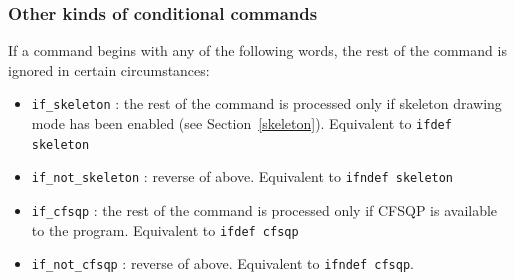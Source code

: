 \documentclass[letterpaper,12pt]{report}
\newcommand{\comment}[1]{}
\begin{document}
\comment{

\subsubsection[The layout variable]{The {\tt layout} variable}

This functionality is deprecated, and I believe it is not used in the demo files.  The {\tt define} functionality gives a more powerful syntax than the older ``layout'' functionality.

Sometimes it{\textquoteright}s not clear what the best way to layout a
motif is. In this case, you might need to write conflicting
R2R commands, and it{\textquoteright}s a hassle to switch the decision
as you think about it.  Therefore, R2R has a built in variable
layoutName, and the ability to run R2R commands only in a given layout.
It does not have a proper preprocessor (which is arguably what I should
do, except that the C/C++ preprocessor cannot be valid Stockholm
format).

{\tt set\_layout} \textit{layoutName}

sets the current layoutName.

{\tt if\_layout} \textit{layoutName}

The following commands (until the next {\tt if\_layout} command) are processed
only if the current layoutName is equal to \textit{layoutName}, or if
\textit{layoutName} is {\textquotedblleft}{\tt all}{\textquotedblright}.

Note: these commands are equivalent to others as follows:
\begin{itemize}
\item {\tt set\_layout quick} is equivalent to {\tt define layout quick}
\item {\tt if\_layout quick} is equivalent to {\tt ifdefeq layout quick}, except that no {\tt else} or {\tt endif} is required or allowed.
\item {\tt if\_layout any} is special, and not equivalent to other commands.  It cannot be mixed with {\tt define} commands.
\end{itemize}
}

\subsubsection{Other kinds of conditional commands}

If a command begins with any of the following words, the rest of the command
is ignored in certain circumstances:
\begin{itemize}
\item {\tt if\_skeleton} : the rest of the command is processed only
if skeleton drawing mode has been enabled (see Section~\ref{skeleton}).  Equivalent to {\tt ifdef skeleton}
\item {\tt if\_not\_skeleton} : reverse of above. Equivalent to {\tt ifndef skeleton}
\item {\tt if\_cfsqp} : the rest of the command is processed only if CFSQP
is available to the program.  Equivalent to {\tt ifdef cfsqp}
\item {\tt if\_not\_cfsqp} : reverse of above.  Equivalent to {\tt ifndef cfsqp}.
\end{itemize}
\end{document}
